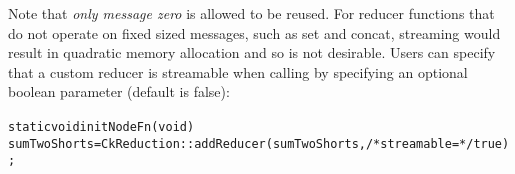 Note that \emph{only message zero} is allowed to be reused.
For reducer functions that do not operate on fixed sized messages,
such as set and concat, streaming would result in quadratic memory
allocation and so is not desirable. Users can specify that a custom
reducer is streamable when calling  by
specifying an optional boolean parameter (default is false):

\begin{alltt}
static void initNodeFn(void) {
    sumTwoShorts = CkReduction::addReducer(sumTwoShorts, /* streamable = */ true);
}
\end{alltt}

